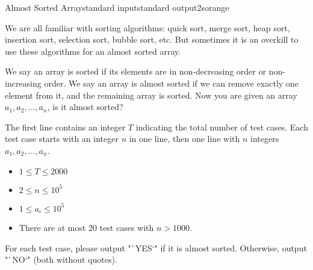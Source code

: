 \begin{problem}{Almost Sorted Array}{standard input}{standard output}{2s}{orange}

We are all familiar with sorting algorithms:
quick sort, merge sort, heap sort, insertion sort, selection sort, bubble sort, etc.
But sometimes it is an overkill to use these algorithms for an almost sorted array.

We say an array is sorted if its elements are in non-decreasing order or non-increasing order.
We say an array is almost sorted if we can remove exactly one element from it,
and the remaining array is sorted.
Now you are given an array $a_1, a_2, \ldots, a_n$, is it almost sorted?

\InputFile
The first line contains an integer $T$ indicating the total number of test cases.
Each test case starts with an integer $n$ in one line,
then one line with $n$ integers $a_1, a_2, \ldots, a_n$.
\begin{itemize}
\item $1 \le T \le 2000$
\item $2 \le n \le 10^5$
\item $1 \le a_i \le 10^5$
\item There are at most 20 test cases with $n > 1000$.
\end{itemize}

\OutputFile
For each test case, please output "`YES`" if it is almost sorted. Otherwise, output "`NO`" (both without quotes).

\Example

\begin{example}
%
\end{example}
\end{problem}